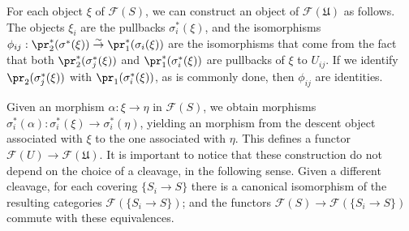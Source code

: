 For each object $\xi$ of $\mathcal{F}(S)$, we can construct an object of $\mathcal{F}(\mathfrak{U})$ as follows. The objects $\xi_i$ are the pullbacks $\sigma_i^*(\xi)$, and the isomorphisms $\phi_{ij}:\pr_2^*(\sigma^*(\xi))\stackrel{\sim}{\to} \pr_1^*(\sigma_i(\xi))$ are the isomorphisms that come from the fact that both $\pr_2^*(\sigma_j^*(\xi))$ and $\pr_1^*(\sigma_i^*(\xi))$ are pullbacks of $\xi$ to $U_{ij}$. If we identify $\pr_2(\sigma_j^*(\xi))$ with $\pr_1(\sigma_i^*(\xi))$, as is commonly done, then $\phi_{ij}$ are identities.\par
Given an morphism $\alpha:\xi\to\eta$ in $\mathcal{F}(S)$, we obtain morphisms $\sigma_i^*(\alpha):\sigma_i^*(\xi)\to \sigma_i^*(\eta)$, yielding an morphism from the descent object associated with $\xi$ to the one associated with $\eta$. This defines a functor $\mathcal{F}(U)\to\mathcal{F}(\mathfrak{U})$. It is important to notice that these construction do not depend on the choice of a cleavage, in the following sense. Given a different cleavage, for each covering $\{S_i\to S\}$ there is a canonical isomorphism of the resulting categories $\mathcal{F}(\{S_i\to S\})$; and the functors $\mathcal{F}(S)\to\mathcal{F}(\{S_i\to S\})$ commute with these equivalences.

